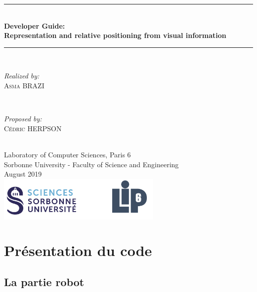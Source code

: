\documentclass[12pt]{report}
\begin{document}
\begin{titlepage}

\newcommand{\HRule}{\rule{\linewidth}{0.5mm}} %

\center 

\HRule \\[0.4cm]
{ \huge \bfseries Developer Guide: \\Representation and relative positioning from visual information}\\[0.4cm]
\HRule \\[1.5cm]

\begin{minipage}{0.4\textwidth}
	\begin{flushleft} \large
		\emph{Realized by:}\\
		\textsc{Asma BRAZI}
	\end{flushleft}
\end{minipage}
~
\begin{minipage}{0.4\textwidth}
	\begin{flushright} \large
		\emph{Proposed by:} \\
		\textsc{Cédric HERPSON}\\
	\end{flushright}
\end{minipage}\\[4cm]


{\large Laboratory of Computer Sciences, Paris 6 \\ Sorbonne University - Faculty of Science and Engineering}\\[3cm] 
{\large August 2019 }\\[3cm] 
\includegraphics[width=0.6\textwidth]{logo.png}\\[1cm] 
\vfill %

\end{titlepage}
\tableofcontents

\chapter{Présentation du code}
\section{La partie robot}
\end{document}
